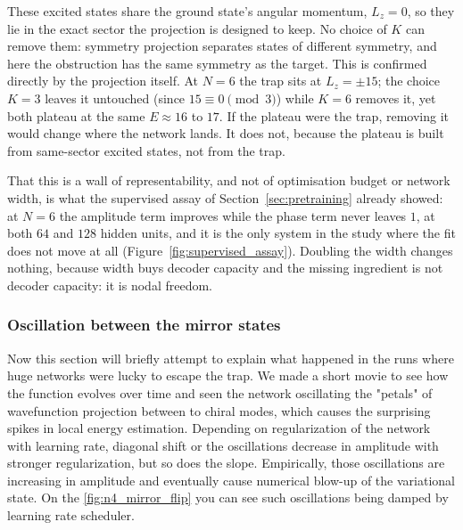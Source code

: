 \documentclass[a4paper,11pt,twoside]{article}
\begin{document}
These excited states share the ground state's angular momentum, $L_z = 0$, so they lie in the exact sector the projection is designed to keep. No choice of $K$ can remove them: symmetry projection separates states of different symmetry, and here the obstruction has the same symmetry as the target. This is confirmed directly by the projection itself. At $N=6$ the trap sits at $L_z = \pm 15$; the choice $K=3$ leaves it untouched (since $15 \equiv 0 \pmod 3$) while $K=6$ removes it, yet both plateau at the same $E \approx 16$ to $17$. If the plateau were the trap, removing it would change where the network lands. It does not, because the plateau is built from same-sector excited states, not from the trap.

That this is a wall of representability, and not of optimisation budget or network width, is what the supervised assay of Section~\ref{sec:pretraining} already showed: at $N=6$ the amplitude term improves while the phase term never leaves $1$, at both $64$ and $128$ hidden units, and it is the only system in the study where the fit does not move at all (Figure~\ref{fig:supervised_assay}). Doubling the width changes nothing, because width buys decoder capacity and the missing ingredient is not decoder capacity: it is nodal freedom.


\subsubsection{Oscillation between the mirror states}
\label{sec:mirror_flip}

Now this section will briefly attempt to explain what happened in the runs where huge networks were lucky to escape the trap. We made a short movie to see how the function evolves over time and seen the network oscillating the "petals" of wavefunction projection between to chiral modes, which causes the surprising spikes in local energy estimation. Depending on regularization of  the network with learning rate, diagonal shift or  the oscillations decrease in amplitude with stronger regularization, but so does the slope. Empirically, those oscillations are increasing in amplitude and eventually cause numerical blow-up of the variational state. On the \ref{fig:n4_mirror_flip} you can see such oscillations being damped by learning rate scheduler.
\end{document}
